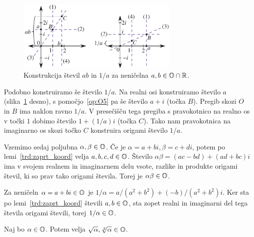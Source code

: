 \begin{dokaz}
    \begin{figure}[h]
        \centering
        \includegraphics[width=0.7\textwidth]{images/algebra/mnozenje_deljenje.png}
        \caption[Množenje in obratna vrednost realnih origami števil]{Konstrukcija števil $ab$ in $1/a$ za neničelna $a, b \in \mathbb O \cap \mathbb R$.}
        \label{fig:mnozenje_deljenje}
    \end{figure}

    Podobno konstruiramo še število $1/a$. Na realni osi konstruiramo število $a$ (slika~\ref{fig:mnozenje_deljenje} desno), s pomočjo~\ref{op:O5} pa še število $a + i$ (točka $B$). Pregib skozi $O$ in $B$ ima naklon ravno $1/a$. V presečišču tega pregiba s pravokotnico na realno os v točki $1$ dobimo število $1 + (1/a) i$ (točka $C$). Tako nam pravokotnica na imaginarno os skozi točko $C$ konstruira origami število $1/a$.

    Vzemimo sedaj poljubna $\alpha, \beta \in \mathbb O$. Če je $\alpha = a + bi, \beta = c + di$, potem po lemi~\ref{trd:zaprt_koord} velja $a, b, c, d \in \mathbb O$. Število $\alpha \beta = (ac - bd) + (ad + bc)i$ ima v svojem realnem in imaginarnem delu vsote, razlike in produkte origami števil, ki so prav tako origami števila. Torej je $\alpha \beta \in \mathbb O$.

    Za neničeln $\alpha = a + bi \in \mathbb O$ je $1/\alpha = a/(a^2+b^2) + (-b)/(a^2+b^2)i$. Ker sta po lemi~\ref{trd:zaprt_koord} števili $a, b \in \mathbb O$, sta zopet realni in imaginarni del tega števila origami števili, torej $1/\alpha \in \mathbb O$.
\end{dokaz}

\begin{trditev}
    \label{trd:zaprtost_koren}
    Naj bo $\alpha \in \mathbb O$. Potem velja $\sqrt{\alpha}, \sqrt[3]{\alpha} \in \mathbb O$.
\end{trditev}

